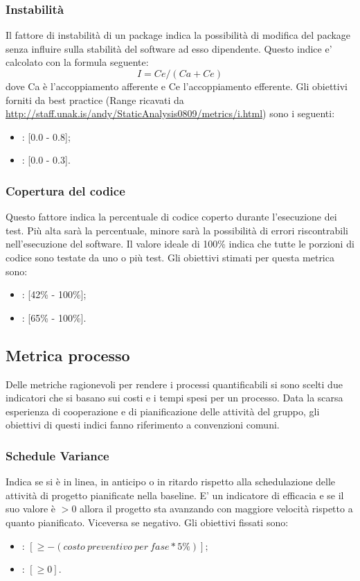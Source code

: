 \subsubsection{Instabilità}
\label{4.2.8}
Il fattore di instabilità di un package indica la possibilità di modifica del package senza influire sulla stabilità del software ad esso dipendente.
Questo indice e’ calcolato con la formula seguente:
$$I = Ce / (Ca + Ce)$$
dove Ca è l'accoppiamento afferente e Ce l'accoppiamento efferente.
Gli obiettivi forniti da best practice (Range ricavati da \url{http://staff.unak.is/andy/StaticAnalysis0809/metrics/i.html}) sono i seguenti:
\begin{itemize}
\item {}: [0.0 - 0.8];
\item {}: [0.0 - 0.3].
\end{itemize}

\subsubsection{Copertura del codice}
\label{4.2.9}
Questo fattore indica la percentuale di codice coperto durante l'esecuzione dei test. Più alta sarà la percentuale, minore sarà la possibilità di errori riscontrabili nell'esecuzione del software. Il valore ideale di 100\% indica che tutte le porzioni di codice sono testate da uno o più test.
Gli obiettivi stimati per questa metrica sono:
\begin{itemize}
\item {}: [42\% - 100\%];
\item {}: [65\% - 100\%].
\end{itemize}


\subsection{Metrica processo} %
\label{4.3}
Delle metriche ragionevoli per rendere i processi quantificabili si sono scelti due indicatori che si basano sui costi e i tempi spesi per un processo. Data la scarsa esperienza di cooperazione e di pianificazione delle attività del gruppo, gli obiettivi di questi indici fanno riferimento a convenzioni comuni.

\subsubsection{Schedule Variance}
\label{4.3.1}
Indica se si è in linea, in anticipo o in ritardo rispetto alla schedulazione delle attività di progetto pianificate nella baseline. E' un indicatore di efficacia e se il suo valore è $> 0$ allora il progetto sta avanzando con maggiore velocità rispetto a quanto pianificato. Viceversa se negativo.
Gli obiettivi fissati sono:
\begin{itemize}
\item {}: $ [\geq -(costo\:preventivo\:per\:fase * 5\%)]; $
\item {}: $ [\geq 0]. $
\end{itemize}

